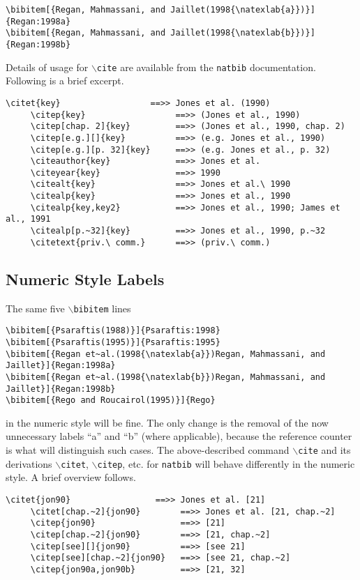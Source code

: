 \documentclass[ijds,nonblindrev]{informs4}
\begin{document}
\begin{Verbatim}[fontsize=\scriptsize]
\bibitem[{Regan, Mahmassani, and Jaillet(1998{\natexlab{a}})}]{Regan:1998a}
\bibitem[{Regan, Mahmassani, and Jaillet(1998{\natexlab{b}})}]{Regan:1998b}
\end{Verbatim}

\noindent 
Details of usage for \texttt{$\backslash $cite} are available from the \texttt{natbib} documentation. Following is a brief excerpt.

\begin{Verbatim}[fontsize=\small]
     \citet{key}                  ==>> Jones et al. (1990)
     \citep{key}                  ==>> (Jones et al., 1990)
     \citep[chap. 2]{key}         ==>> (Jones et al., 1990, chap. 2)
     \citep[e.g.][]{key}          ==>> (e.g. Jones et al., 1990)
     \citep[e.g.][p. 32]{key}     ==>> (e.g. Jones et al., p. 32)
     \citeauthor{key}             ==>> Jones et al.
     \citeyear{key}               ==>> 1990
     \citealt{key}                ==>> Jones et al.\ 1990
     \citealp{key}                ==>> Jones et al., 1990
     \citealp{key,key2}           ==>> Jones et al., 1990; James et al., 1991
     \citealp[p.~32]{key}         ==>> Jones et al., 1990, p.~32
     \citetext{priv.\ comm.}      ==>> (priv.\ comm.)
\end{Verbatim}

\subsection{Numeric Style Labels}\label{sec11.12}

The same five \texttt{$\backslash $bibitem} lines

\begin{Verbatim}[fontsize=\scriptsize]
\bibitem[{Psaraftis(1988)}]{Psaraftis:1998}
\bibitem[{Psaraftis(1995)}]{Psaraftis:1995}
\bibitem[{Regan et~al.(1998{\natexlab{a}})Regan, Mahmassani, and Jaillet}]{Regan:1998a}
\bibitem[{Regan et~al.(1998{\natexlab{b}})Regan, Mahmassani, and Jaillet}]{Regan:1998b}
\bibitem[{Rego and Roucairol(1995)}]{Rego}
\end{Verbatim}

\noindent
in the numeric style will be fine. The only change is the removal of the now 
unnecessary labels ``a'' and ``b'' (where applicable), because the reference 
counter is what will distinguish such cases. The above-described command 
\texttt{$\backslash $cite} and its derivations \texttt{$\backslash 
$citet}, \texttt{$\backslash $citep}, etc. for \texttt{natbib} will 
behave differently in the numeric style. A brief overview follows.

\begin{Verbatim}[fontsize=\small]
     \citet{jon90}                 ==>> Jones et al. [21]
     \citet[chap.~2]{jon90}        ==>> Jones et al. [21, chap.~2]
     \citep{jon90}                 ==>> [21]
     \citep[chap.~2]{jon90}        ==>> [21, chap.~2]
     \citep[see][]{jon90}          ==>> [see 21]
     \citep[see][chap.~2]{jon90}   ==>> [see 21, chap.~2]
     \citep{jon90a,jon90b}         ==>> [21, 32]
\end{Verbatim}
\end{document}
